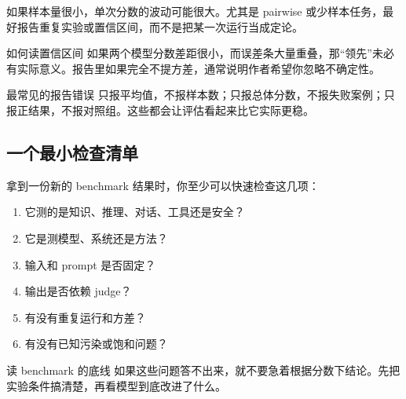 如果样本量很小，单次分数的波动可能很大。尤其是 pairwise 或少样本任务，最好报告重复实验或置信区间，而不是把某一次运行当成定论。

\begin{knowledgebox}{如何读置信区间}
如果两个模型分数差距很小，而误差条大量重叠，那“领先”未必有实际意义。报告里如果完全不提方差，通常说明作者希望你忽略不确定性。
\end{knowledgebox}

\begin{warningbox}{最常见的报告错误}
只报平均值，不报样本数；只报总体分数，不报失败案例；只报正结果，不报对照组。这些都会让评估看起来比它实际更稳。
\end{warningbox}

\subsection{一个最小检查清单}

拿到一份新的 benchmark 结果时，你至少可以快速检查这几项：
\begin{enumerate}
    \item 它测的是知识、推理、对话、工具还是安全？
    \item 它是测模型、系统还是方法？
    \item 输入和 prompt 是否固定？
    \item 输出是否依赖 judge？
    \item 有没有重复运行和方差？
    \item 有没有已知污染或饱和问题？
\end{enumerate}

\begin{importantbox}{读 benchmark 的底线}
如果这些问题答不出来，就不要急着根据分数下结论。先把实验条件搞清楚，再看模型到底改进了什么。
\end{importantbox}

